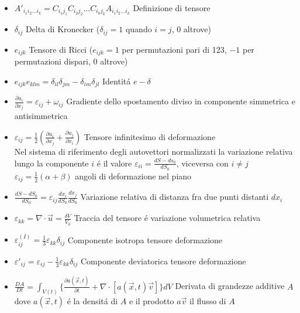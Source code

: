 \documentclass[a4paper]{article}
\begin{document}
\begin{itemize}
	\item $A'_{i_1i_2...i_k}=C_{i_1j_1}C_{i_2j_2}...C_{i_kj_k}A_{i_1i_2...i_k}$ Definizione di tensore
	
	\item $\delta_{ij}$ Delta di Kronecker ($\delta_{ij} = 1$ quando $i=j$, $0$ altrove)
	
	\item $e_{ijk}$ Tensore di Ricci ($e_{ijk}=1$ per permutazioni pari di 123, $-1$ per permutazioni dispari, $0$ altrove)
	
	\item $e_{ijk}e_{klm}=\delta_{il}\delta_{jm}-\delta_{im}\delta_{jl}$ Identit\'a $e-\delta$
	
	\item $\frac{\partial u_i}{\partial x_j} = \varepsilon_{ij}+\omega_{ij}$ Gradiente dello spostamento diviso in componente simmetrica e antisimmetrica
	
	\item $\varepsilon_{ij}=\frac{1}{2}(\frac{\partial u_i}{\partial x_j}+\frac{\partial u_j}{\partial x_i})$ Tensore infinitesimo di deformazione\\
	Nel sistema di riferimento degli autovettori normalizzati la variazione relativa lungo la componente $i$ \'e il valore $\varepsilon_{ii} = \frac{dS-ds_0}{dS_0}$, viceversa con $i \neq j$  $\varepsilon_{ij}=\frac{1}{2}(\alpha + \beta)$ angoli di deformazione nel piano
	
	\item $\frac{dS-dS_0}{dS_0}=\varepsilon_{ij} \frac{dx_i}{dS_0} \frac{dx_j}{dS_0}$ Variazione relativa di distanza fra due punti distanti $dx_i$
	
	\item $ \varepsilon_{kk}=\nabla \cdot \overrightarrow{u} = \frac{\delta V}{V_0}$ Traccia del tensore \'e variazione volumetrica relativa
	
	\item $\varepsilon^{(I)}_{ij} = \frac{1}{3} \varepsilon_{kk}\delta_{ij}$ Componente isotropa tensore deformazione
	
	\item $\varepsilon'_{ij} = \varepsilon_{ij} -\frac{1}{3} \varepsilon_{kk}\delta_{ij}$ Componente deviatorica tensore deformazione
	
	\item $\frac{DA}{Dt}=\int_{V(t)} \{ \frac{\partial a(\overrightarrow{x},t)}{\partial t} + \nabla \cdot [a(\overrightarrow{x}, t)\overrightarrow{v}] \} dV$ Derivata di grandezze additive $A$ dove $a(\overrightarrow{x},t)$ \'e la densit\'a di $A$ e il prodotto $a \overrightarrow{v}$ il flusso di $A$
	

\end{itemize}
\end{document}
